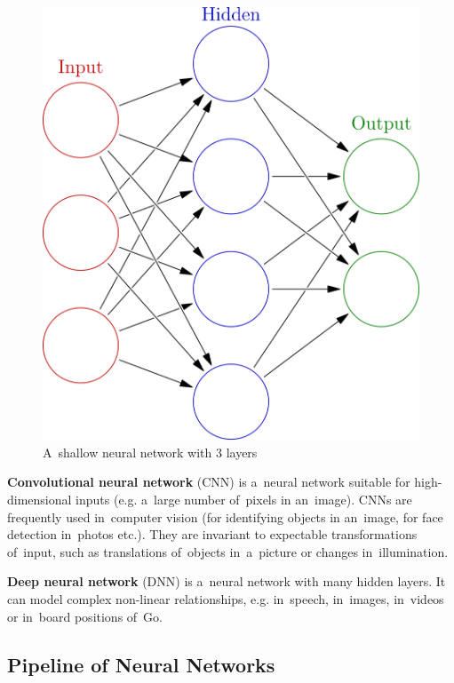 \begin{figure}[H]
  \centering
  \includegraphics[height=.2\textheight]{../img/colored_neural_network.png}
  \caption{A~shallow neural network with 3 layers}
  \label{fig:shallow-neural-network}
\end{figure}

\textbf{Convolutional neural network} (CNN) is a~neural network suitable for high-dimensional inputs (e.g. a~large number of~pixels in an~image).
CNNs are frequently used in~computer vision (for identifying objects in an~image, for face detection in~photos etc.).
They are invariant to expectable transformations of~input, such as translations of~objects in~a~picture or changes in~illumination.

\textbf{Deep neural network} (DNN) is a~neural network with many hidden layers.
It can model complex non-linear relationships, e.g. in~speech, in~images, in~videos or in~board positions of~Go.

\subsection{Pipeline of Neural Networks}

